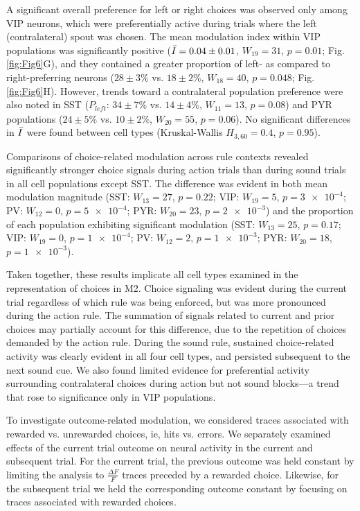A significant overall preference for left or right choices was observed only among VIP neurons, which were preferentially active during trials where the left (contralateral) spout was chosen. The mean modulation index within VIP populations was significantly positive ($\Bar{I}=0.04\pm0.01$, $W_{19}=31$, $p=\num{0.01}$; Fig. \ref{fig:Fig6}G), and they contained a greater proportion of left- as compared to right-preferring neurons ($28\pm3\%$ vs. $18\pm2\%$, $W_{18}=40$, $p=0.048$; Fig. \ref{fig:Fig6}H). However, trends toward a contralateral population preference were also noted in SST ($P_{\mathit{left}}$: $34\pm7\%$ vs. $14\pm4\%$, $W_{11}=13$, $p=0.08$) and PYR populations ($24\pm5\%$ vs. $10\pm2\%$, $W_{20}=55$, $p=0.06$). No significant differences in $\Bar{I}$ were found between cell types (Kruskal-Wallis $H_{3,60}=0.4$, $p=0.95$). 

Comparisons of choice-related modulation across rule contexts revealed significantly stronger choice signals during action trials than during sound trials in all cell populations except SST. The difference was evident in both mean modulation magnitude (SST: $W_{13}=27$, $p=\num{0.22}$; VIP: $W_{19}=5$, $p=\num{3e-4}$; PV: $W_{12}=0$, $p=\num{5e-4}$; PYR: $W_{20}=23$, $p=\num{2e-3}$) and the proportion of each population exhibiting significant modulation (SST: $W_{13}=25$, $p=\num{0.17}$; VIP: $W_{19}=0$, $p=\num{1e-4}$; PV: $W_{12}=2$, $p=\num{1e-3}$; PYR: $W_{20}=18$, $p=\num{1e-3}$). 

Taken together, these results implicate all cell types examined in the representation of choices in M2. Choice signaling was evident during the current trial regardless of which rule was being enforced, but was more pronounced during the action rule. The summation of signals related to current and prior choices may partially account for this difference, due to the repetition of choices demanded by the action rule. During the sound rule, sustained choice-related activity was clearly evident in all four cell types, and persisted subsequent to the next sound cue. We also found limited evidence for preferential activity surrounding contralateral choices during action but not sound blocks---a trend that rose to significance only in VIP populations.       

To investigate outcome-related modulation, we considered traces associated with rewarded vs. unrewarded choices, ie, hits vs. errors. We separately examined effects of the current trial outcome on neural activity in the current and subsequent trial. For the current trial, the previous outcome was held constant by limiting the analysis to $\frac{\Delta F}{F}$ traces preceded by a rewarded choice. Likewise, for the subsequent trial we held the corresponding outcome constant by focusing on traces associated with rewarded choices.

